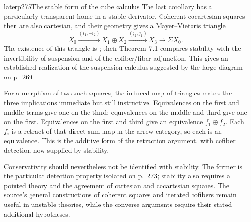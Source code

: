 \begin{dcomment}{later}{p275}{The stable form of the cube calculus}
The last corollary has a particularly transparent home in a stable derivator. Coherent cocartesian squares then are also cartesian, and their geometry gives a Mayer--Vietoris triangle
\[
 X_0\xrightarrow{(i_1,-i_2)}X_1\oplus X_2
 \xrightarrow{(j_2,j_1)}X_3\longrightarrow\Sigma X_0.
\]
The existence of this triangle is \citet[Theorem~6.1, arXiv v2]{GrothPontoShulman2014}; their Theorem~7.1 compares stability with the invertibility of suspension and of the cofiber/fiber adjunction. This gives an established realization of the suspension calculus suggested by the large diagram on p.~269.

For a morphism of two such squares, the induced map of triangles makes the three implications immediate but still instructive. Equivalences on the first and middle terms give one on the third; equivalences on the middle and third give one on the first. Equivalences on the first and third give an equivalence
$f_1\oplus f_2$. Each $f_i$ is a retract of that direct-sum map in the arrow category, so each is an equivalence. This is the additive form of the retraction argument, with cofiber detection now supplied by stability.

Conservativity should nevertheless not be identified with stability. The former is the particular detection property isolated on p.~273; stability also requires a pointed theory and the agreement of cartesian and cocartesian squares. The source's general constructions of coherent squares and iterated cofibers remain useful in unstable theories, while the converse arguments require their stated additional hypotheses.
\end{dcomment}
